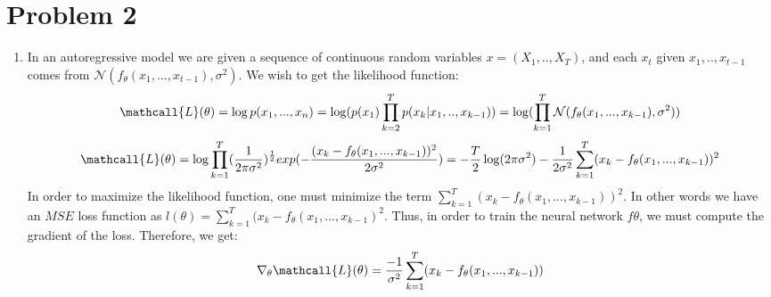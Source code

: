 \documentclass{article}
\begin{document}
\section*{Problem 2}
\begin{enumerate} %
    \item In an autoregressive model we are given a sequence of continuous random variables  $x = (X_1, ..,X_T)$, and each $x_t$ given  $x_1,..,x_{t-1}$ comes from $\mathcal{N}(f_\theta(x_1,...,x_{t-1}) , \sigma^2)$. We wish to get the likelihood function:
    \begin{equation*}
         \mathcall{L}(\theta) = \log p(x_1,...,x_n) = \log (p(x_1) \prod_{k=2}^T p(x_k|x_1,..,x_{k-1} ) ) = \log(\prod_{k=1}^T \mathcal{N}(f_\theta(x_1,...,x_{k-1}) , \sigma^2))
    \end{equation*} 
    \begin{equation*}
         \mathcall{L}(\theta) = \log \prod_{k=1}^T (\frac{1}{2\pi \sigma^2})^{\frac{1}{2}} exp{(-\frac{(x_k - f_\theta(x_1,...,x_{k-1}))^2}{2 \sigma^2})} =
         - \frac{T}{2} \log(2\pi \sigma^2) - \frac{1}{2\sigma^2} 
         \sum_{k=1}^T (x_k - f_\theta(x_1,...,x_{k-1}))^2
    \end{equation*}
    In order to maximize the likelihood function, one must minimize the term $\sum_{k=1}^T (x_k - f_\theta(x_1,...,x_{k-1}))^2$. In other words we have an $MSE$ loss function as $l(\theta) = \sum_{k=1}^T (x_k - f_\theta(x_1,...,x_{k-1})^2$. 
    Thus, in order to train the neural network $f\theta$, we must
    compute the gradient of the loss. Therefore, we get:
    \begin{equation*}
        \nabla_\theta \mathcall{L}(\theta) = \frac{-1}{\sigma^2} \sum_{k=1}^T  (x_k -f_\theta(x_1,...,x_{k-1})) 
        

\end{equation*}
\end{enumerate}
\end{document}
